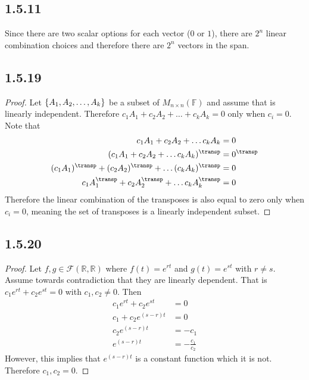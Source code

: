 \documentclass[12pt,titlepage]{extarticle}
\begin{document}
\subsection*{1.5.11}
Since there are two scalar options for each vector ($0$ or $1$), there are $2^n$ linear combination choices and therefore there are $2^n$ vectors in the span.

\subsection*{1.5.19}
\begin{proof}
	Let $\qty{A_1, A_2, \ldots, A_k}$ be a subset of $M_{n\times n}(\mathbb{F})$ and assume that is linearly independent. Therefore $c_1 A_1 + c_2 A_2 + \ldots + c_k A_k = 0$ only when $c_i = 0$. Note that
	\begin{align*}
		c_1 A_1 + c_2 A_2 + \ldots c_k A_k &= 0 \\
		(c_1 A_1 + c_2 A_2 + \ldots c_k A_k)^\transp &= 0^\transp \\
		(c_1 A_1)^\transp + (c_2 A_2)^\transp + \ldots (c_k A_k)^\transp &= 0 \\
		c_1 A_1^\transp + c_2 A_2^\transp + \ldots c_k A_k^\transp &= 0 \\
	\end{align*}
	Therefore the linear combination of the transposes is also equal to zero only when $c_i = 0$, meaning the set of transposes is a linearly independent subset.
\end{proof}

\subsection*{1.5.20}
\begin{proof}
	Let $f,g \in \mathcal{F}(\mathbb{R}, \mathbb{R})$ where $f(t) = e^{rt}$ and $g(t) = e^{st}$ with $r \neq s$. Assume towards contradiction that they are linearly dependent. That is $c_1 e^{rt} + c_2 e^{st} = 0$ with $c_1, c_2 \neq 0$. Then
	\begin{align*}
		c_1 e^{rt} + c_2 e^{st} &= 0 \\
		c_1 + c_2 e^{(s-r)t} &= 0 \\
		c_2 e^{(s-r)t} &= -c_1 \\
		e^{(s-r)t} &= -\frac{c_1}{c_2}
	\end{align*}
	However, this implies that $e^{(s-r)t}$ is a constant function which it is not. Therefore $c_1, c_2 = 0$.
\end{proof}
\end{document}
